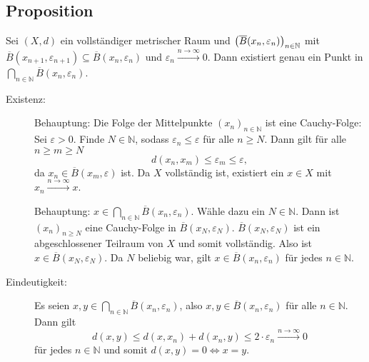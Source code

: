 \subsection[Proposition über eine Folge von Bällen]{Proposition} %
\label{sub:19}
Sei $(X,d)$ ein vollständiger metrischer Raum und $\enbrace*{\overline{B}(x_n, \varepsilon_n)}_{n \in \mathds{N}}$ mit 
$\overline{B}(x_{n+1}, \varepsilon_{n+1}) \subseteq \overline{B}(x_n,\varepsilon_n)$ und $\varepsilon_n \xrightarrow{n \to \infty} 0$. Dann existiert genau 
ein Punkt in $\bigcap_{n \in \mathds{N}} \overline{B}(x_n, \varepsilon_n)$.
\begin{description}
	\item[Existenz:] Behauptung: Die Folge der Mittelpunkte $(x_n)_{n \in\mathds{N}}$ ist eine Cauchy-Folge: Sei $\varepsilon >0$. Finde $N \in \mathds{N}$,
	sodass $\varepsilon_n \le \varepsilon$ für alle $n \ge N$. Dann gilt für alle $n \ge m \ge N$
	\[
		d(x_n, x_m) \le \varepsilon_m \le \varepsilon,
	\]
	da $x_n \in \overline{B}(x_m, \varepsilon)$ ist. Da $X$ vollständig ist, existiert ein $x \in X$ mit $x_n \xrightarrow{n \to \infty} x$.
	
	Behauptung: $x \in \bigcap_{n \in \mathds{N}} \overline{B}(x_n, \varepsilon_n)$. Wähle dazu ein $N \in \mathds{N}$. Dann ist $(x_n)_{n \ge N}$ eine
	Cauchy-Folge in $\overline{B}(x_N,\varepsilon_N)$. $\overline{B}(x_N,\varepsilon_N)$ ist ein abgeschlossener Teilraum von $X$ und somit vollständig. 
	Also ist $x \in \overline{B}(x_N,\varepsilon_N)$. Da $N$ beliebig war, gilt $x \in \overline{B}(x_n,\varepsilon_n)$ für jedes $n \in \mathds{N}$.
	\item[Eindeutigkeit:] Es seien $x,y \in \bigcap_{n \in \mathds{N}} \overline{B}(x_n,\varepsilon_n)$, also 
	$x,y \in \overline{B}(x_n, \varepsilon_n) $ für alle $ n \in \mathds{N}$. Dann gilt
	\[
		d(x,y) \le d(x,x_n) + d(x_n,y) \le 2 \cdot \varepsilon_n \xrightarrow{n \to \infty} 0
	\]
	für jedes $n \in \mathds{N}$ und somit $d(x,y)=0 \Leftrightarrow x=y$. \bewende
\end{description}

